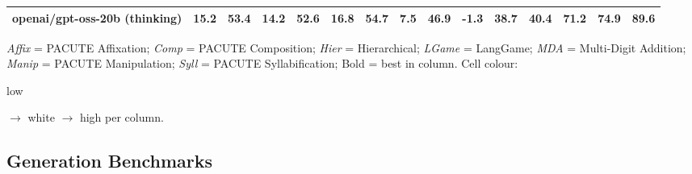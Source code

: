 \documentclass{article}
\begin{document}
\begin{table}[htbp]
\begin{threeparttable}
\begin{adjustbox}{max width=\textwidth}
\begin{tabular}{lrrrrrrrrrrrrrr}
openai/gpt-oss-20b (thinking) & \cellcolor[HTML]{FBE5DB}15.2 & \cellcolor[HTML]{FCEBE3}53.4 & \cellcolor[HTML]{B7D8E9}14.2 & \cellcolor[HTML]{B5D8E8}52.6 & \cellcolor[HTML]{FDF6F2}16.8 & \cellcolor[HTML]{FEFEFE}54.7 & \cellcolor[HTML]{FEF9F7}7.5 & \cellcolor[HTML]{F7FAFC}46.9 & \cellcolor[HTML]{F8FBFD}-1.3 & \cellcolor[HTML]{F6FAFC}38.7 & \cellcolor[HTML]{FBE4D9}40.4 & \cellcolor[HTML]{FDF3EE}71.2 & \cellcolor[HTML]{9CCAE1}74.9 & \cellcolor[HTML]{99C9E0}89.6 \\
\bottomrule
\end{tabular}
\end{adjustbox}
\begin{tablenotes}[flushleft]\footnotesize
\item \textit{Affix} = PACUTE Affixation; \textit{Comp} = PACUTE Composition; \textit{Hier} = Hierarchical; \textit{LGame} = LangGame; \textit{MDA} = Multi-Digit Addition; \textit{Manip} = PACUTE Manipulation; \textit{Syll} = PACUTE Syllabification; Bold = best in column. Cell colour: \colorbox[HTML]{F4A582}{\strut low} $\to$ white $\to$ \colorbox[HTML]{92C5DE}{high} per column.
\end{tablenotes}
\end{threeparttable}
\end{table}

\subsection*{Generation Benchmarks}
\end{document}
